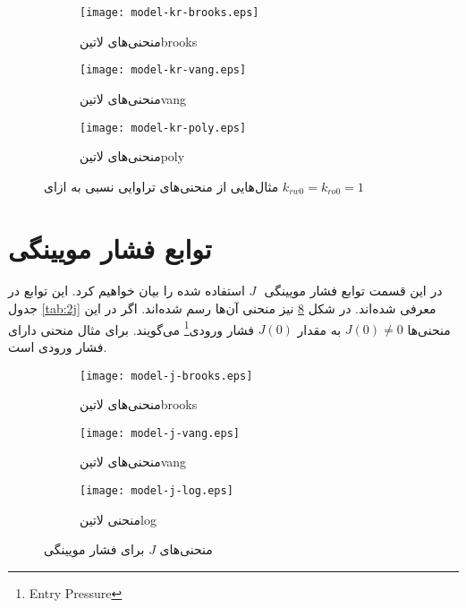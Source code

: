 \begin{figure}
 \centering
\begin{subfigure}{0.3\textwidth}
\texttt{[image: model-kr-brooks.eps]} 
\caption{منحنی‌های \text‌لاتین{brooks}}
\label{fig:2kr-brooks}
\end{subfigure}
\begin{subfigure}{0.3\textwidth}
\texttt{[image: model-kr-vang.eps]}
\caption{منحنی‌های \text‌لاتین{vang}}
\label{fig:2kr-vang}
\end{subfigure}
\begin{subfigure}{.3\textwidth}
\texttt{[image: model-kr-poly.eps]}
\caption{منحنی‌های \text‌لاتین{poly}}
\label{fig:2kr-poly}
\end{subfigure}
\caption[مثال‌هایی از منحنی‌های تراوایی نسبی]{مثال‌هایی از منحنی‌های تراوایی نسبی به ازای $k_{rw0}=k_{ro0}=1$} 
\label{fig:2kr}
\end{figure}
\section{توابع فشار مویینگی}
در این قسمت توابع فشار مویینگی ‌ $J$ استفاده شده را بیان خواهیم کرد. این توابع در جدول \ref{tab:2j} معرفی شده‌اند. در شکل \ref{fig:2j} نیز منحنی آن‌ها رسم شده‌اند. اگر در این منحنی‌ها $J(0) \neq 0$ به مقدار $J(0)$ فشار ورودی\footnote{Entry Pressure} می‌گویند. برای مثال منحنی  دارای فشار ورودی است.


\begin{figure}[h]
\begin{subfigure}{0.3\textwidth}
\texttt{[image: model-j-brooks.eps]} 
\caption{منحنی‌های \text‌لاتین{brooks}}
\label{fig:2j-brooks}
\end{subfigure}
\begin{subfigure}{0.3\textwidth}
\texttt{[image: model-j-vang.eps]}
\caption{منحنی‌های \text‌لاتین{vang}}
\label{fig:2j-vang}
\end{subfigure}
\begin{subfigure}{0.3\textwidth}
\texttt{[image: model-j-log.eps]}
\caption{منحنی‌ \text‌لاتین{log}}
\label{fig:2j-log}
\end{subfigure} 
\caption{منحنی‌های $J$ برای فشار مویینگی}
\label{fig:2j}
\end{figure}

